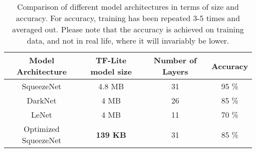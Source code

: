 \begin{table}[]
    \centering
    \begin{tabular}{|c|c|c|c|}
        \hline Model Architecture & TF-Lite model size & Number of Layers & Accuracy  \\\hline
        \hline SqueezeNet & 4.8 MB & 31 & 95 \%  \\\hline
        DarkNet &  4 MB & 26 & 85 \%  \\\hline
        LeNet & 4 MB & 11 & 70 \%  \\\hline
        Optimized SqueezeNet & \textbf{139 KB} & 31 & 85 \%  \\\hline
    \end{tabular}
    \caption{Comparison of different model architectures in terms of size and accuracy. For accuracy, training has been repeated 3-5 times and averaged out. Please note that the accuracy is achieved on training data, and not in real life, where it will invariably be lower.}
    \label{tab:model_archs}
\end{table}